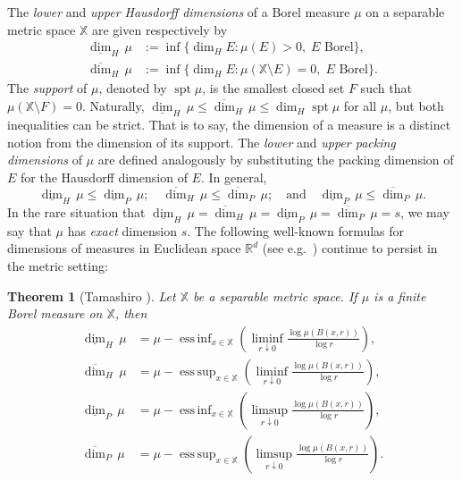 \documentclass[12pt]{amsart}
\newtheorem{theorem}{Theorem}[section]
\theoremstyle{definition}
\theoremstyle{remark}
\newcommand{\RR}{\mathbb{R}}
\newcommand{\XX}{\mathbb{X}}
\newcommand{\spt}{\mathop\mathrm{spt}\nolimits}
\newcommand{\dash}{{\!-\!}}
\newcommand{\essinf}{\mathop\mathrm{ess\,inf}}
\newcommand{\esssup}{\mathop\mathrm{ess\,sup}}
\numberwithin{figure}{section}
\numberwithin{equation}{section}
\begin{document}
The \emph{lower} and \emph{upper Hausdorff dimensions} of a Borel measure $\mu$ on a separable metric space $\XX$ are given respectively by \begin{align} \underline{\dim}_H\, \mu &:=\inf\{\dim_H E:\mu(E)>0,\;E\text{ Borel}\},\\ \overline{\dim}_H\, \mu &:=\inf\{\dim_H E:\mu(\XX\setminus E)=0,\;E\text{ Borel}\}.\end{align} The \emph{support} of $\mu$, denoted by $\spt\mu$, is the smallest closed set $F$ such that $\mu(\XX\setminus F)=0$. Naturally, $\underline{\dim}_H\,\mu\leq \overline{\dim}_H\,\mu\leq \dim_H\spt\mu$ for all $\mu$, but both inequalities can be strict. That is to say, the dimension of a measure is a distinct notion from the dimension of its support. The \emph{lower} and \emph{upper packing dimensions} of $\mu$ are defined analogously by substituting the packing dimension of $E$ for the Hausdorff dimension of $E$. In general, \begin{equation}\underline{\dim}_H\,\mu\leq \underline{\dim}_P\,\mu;\quad \overline{\dim}_H\,\mu\leq \overline{\dim}_P\,\mu;\quad\text{and}\quad \underline{\dim}_P\,\mu\leq \overline{\dim}_P\,\mu.\end{equation} In the rare situation that $\underline{\dim}_H\,\mu=\overline{\dim}_H\,\mu=\underline{\dim}_P\,\mu=\overline{\dim}_P\,\mu=s$, we may say that $\mu$ has \emph{exact} dimension $s$. The following well-known formulas for dimensions of measures in Euclidean space $\RR^d$ (see e.g.~\cite{Falconer-techniques}) continue to persist in the metric setting:

\begin{theorem}[{Tamashiro \cite[Theorem 1.8]{tamashiro}}] \label{metric-local-dim} Let $\XX$ be a separable metric space. If $\mu$ is a finite Borel measure on $\XX$, then \begin{align}
  \label{dim1} \underline{\dim}_H\,\mu &= \mu\dash\essinf_{x\in\XX} \left(\liminf_{r\downarrow 0} \frac{\log \mu(B(x,r))}{\log r}\right),\\
  \label{dim2} \overline{\dim}_H\,\mu &= \mu\dash\esssup_{x\in\XX} \left(\liminf_{r\downarrow 0} \frac{\log \mu(B(x,r))}{\log r}\right),\\
  \label{dim3} \underline{\dim}_P\,\mu &= \mu\dash\essinf_{x\in\XX} \left(\limsup_{r\downarrow 0} \frac{\log \mu(B(x,r))}{\log r}\right),\\
  \label{dim4} \overline{\dim}_P\,\mu &= \mu\dash\esssup_{x\in\XX} \left(\limsup_{r\downarrow 0} \frac{\log \mu(B(x,r))}{\log r}\right).
\end{align}\end{theorem}
\end{document}
